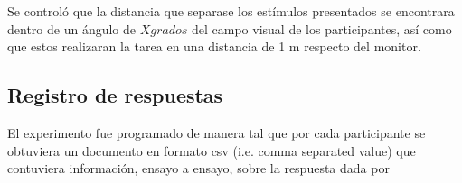 


Se controló que la distancia que separase los estímulos presentados se encontrara dentro de un ángulo de $X grados$ del campo visual de los participantes, así como que estos realizaran la tarea en una distancia de 1 m respecto del monitor.



\subsection{Registro de respuestas}

El experimento fue programado de manera tal que por cada participante se obtuviera un documento en formato csv (i.e. comma separated value) que contuviera información, ensayo a ensayo, sobre la respuesta dada por 
